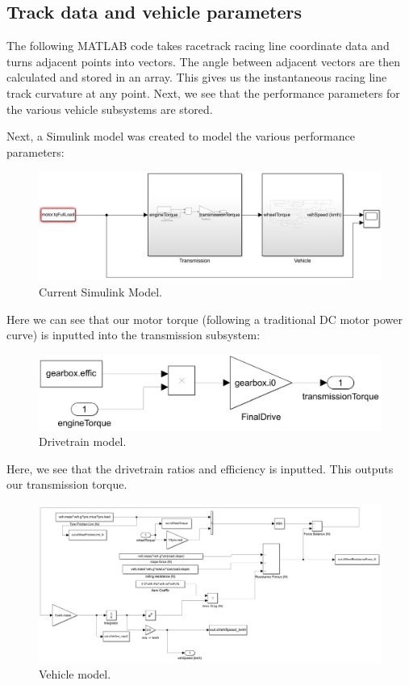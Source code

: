 \documentclass{article}
\begin{document}
\subsection{Track data and vehicle parameters}
The following MATLAB code takes racetrack racing line coordinate data and turns adjacent points into vectors. The angle between adjacent vectors are then calculated and stored in an array. This gives us the instantaneous racing line track curvature at any point. Next, we see that the performance parameters for the various vehicle subsystems are stored. 

Next, a Simulink model was created to model the various performance parameters:
\begin{figure}[H]
	\centering
	\includegraphics[width = \textwidth]{./img/simulink1.jpg}
	\caption{Current Simulink Model.}
\end{figure}
Here we can see that our motor torque (following a traditional DC motor power curve) is inputted into the transmission subsystem:
\begin{figure}[H]
	\centering
	\includegraphics[width = \textwidth]{./img/simulink3.png}
	\caption{Drivetrain model.}
\end{figure}
Here, we see that the drivetrain ratios and efficiency is inputted. This outputs our transmission torque.
\begin{figure}[H]
	\centering
	\includegraphics[width = \textwidth]{./img/simulink4.png}
	\caption{Vehicle model.}
\end{figure}
\end{document}
